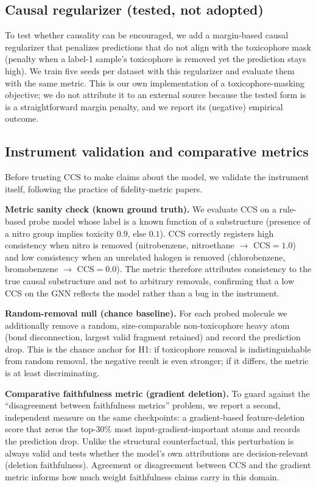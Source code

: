 \documentclass[journal]{IEEEtran}
\begin{document}
\subsection{Causal regularizer (tested, not adopted)}
To test whether causality can be encouraged, we add a margin-based causal
regularizer that penalizes predictions that do not align with the toxicophore
mask (penalty when a label-1 sample's toxicophore is removed yet the prediction
stays high). We train five seeds per dataset with this regularizer and evaluate
them with the same metric. This is our own implementation of a toxicophore-masking
objective; we do not attribute it to an external source because the tested form is
is a straightforward margin penalty, and we report its (negative) empirical outcome.

\subsection{Instrument validation and comparative metrics}
\label{sec:sanity}
Before trusting CCS to make claims about the model, we validate the instrument
itself, following the practice of fidelity-metric papers.

\textbf{Metric sanity check (known ground truth).} We evaluate CCS on a
rule-based probe model whose label is a known function of a substructure (presence
of a nitro group implies toxicity $0.9$, else $0.1$). CCS correctly registers high
consistency when nitro is removed (nitrobenzene, nitroethane $\to$ CCS$=1.0$) and
low consistency when an unrelated halogen is removed (chlorobenzene, bromobenzene
$\to$ CCS$=0.0$). The metric therefore attributes consistency to the true causal
substructure and not to arbitrary removals, confirming that a low CCS on the GNN
reflects the model rather than a bug in the instrument.

\textbf{Random-removal null (chance baseline).} For each probed molecule we
additionally remove a random, size-comparable non-toxicophore heavy atom (bond
disconnection, largest valid fragment retained) and record the prediction drop.
This is the chance anchor for H1: if toxicophore removal is indistinguishable
from random removal, the negative result is even stronger; if it differs, the
metric is at least discriminating.

\textbf{Comparative faithfulness metric (gradient deletion).} To guard against
the ``disagreement between faithfulness metrics'' problem, we report a second,
independent measure on the same checkpoints: a gradient-based feature-deletion
score that zeros the top-$30\%$ most input-gradient-important atoms and records
the prediction drop. Unlike the structural counterfactual, this perturbation is
always valid and tests whether the model's own attributions are decision-relevant
(deletion faithfulness). Agreement or disagreement between CCS and the gradient
metric informs how much weight faithfulness claims carry in this domain.
\end{document}
